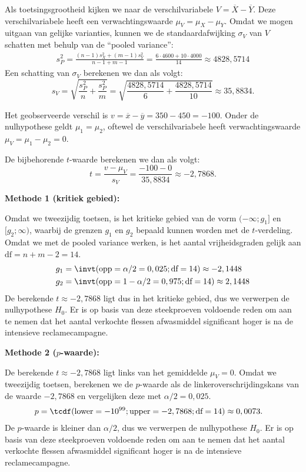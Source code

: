 {    Als toetsingsgrootheid kijken we naar de verschilvariabele $V = \overline{X} - \overline{Y}$.
    Deze verschilvariabele heeft een verwachtingswaarde $\mu_V = \mu_X - \mu_Y$.
    Omdat we mogen uitgaan van gelijke varianties, kunnen we de standaardafwijking $\sigma_V$ van $V$ schatten met behulp van de ``pooled variance'':
    \begin{align*}
        s_P^2 = \frac{(n-1)s_X^2+(m-1)s_Y^2}{n-1+m-1} = \frac{6\cdot 4600 + 10 \cdot 4000}{14} \approx 4828,5714
    \end{align*}
    Een schatting van $\sigma_V$ berekenen we dan als volgt:
    \[
        s_V = \sqrt{\frac{s_P^2}{n} + \frac{s_P^2}{m}} = \sqrt{\frac{4828,5714}{6} + \frac{4828,5714}{10}}\approx 35,8834.
    \]

    Het geobserveerde verschil is $v = \overline{x} - \overline{y} = 350 - 450 = -100$.
    Onder de nulhypothese geldt $\mu_1 = \mu_2$, oftewel de verschilvariabele heeft verwachtingswaarde $\mu_V = \mu_1 - \mu_2 = 0$.

    De bijbehorende $t$-waarde berekenen we dan als volgt:
    \[
        t = \frac{v - \mu_V}{s_V} = \frac{-100 - 0}{35,8834} \approx -2,7868.
    \]

    {\bfseries Methode 1 (kritiek gebied):}
    
    Omdat we tweezijdig toetsen, is het kritieke gebied van de vorm $(-\infty; g_1]$ en $[g_2; \infty)$, waarbij de grenzen $g_1$ en $g_2$ bepaald kunnen worden met de $t$-verdeling.
    Omdat we met de pooled variance werken, is het aantal vrijheidsgraden gelijk aan $\text{df}=n+m-2=14$.
    \begin{align*}
        g_1 &= \invt(\text{opp}=\alpha/2 = 0,025; \text{df}=14) \approx-2,1448 \\
        g_2 &= \invt(\text{opp}=1-\alpha/2 = 0,975; \text{df}=14) \approx 2,1448
    \end{align*}
    De berekende $t \approx -2,7868$ ligt dus in het kritieke gebied, dus we verwerpen de nulhypothese $H_0$.
    Er is op basis van deze steekproeven voldoende reden om aan te nemen dat het aantal verkochte flessen afwasmiddel significant hoger is na de intensieve reclamecampagne.

    {\bfseries Methode 2 ($p$-waarde):}

    De berekende $t \approx -2,7868$ ligt links van het gemiddelde $\mu_V = 0$.
    Omdat we tweezijdig toetsen, berekenen we de $p$-waarde als de linkeroverschrijdingskans van de waarde $-2,7868$ en vergelijken deze met $\alpha/2 = 0,025$.
    \begin{align*}
        p &= \tcdf(\text{lower}=-10^{99}; \text{upper}=-2,7868; \text{df}=14) \approx 0,0073.
    \end{align*}
    De $p$-waarde is kleiner dan $\alpha/2$, dus we verwerpen de nulhypothese $H_0$.
    Er is op basis van deze steekproeven voldoende reden om aan te nemen dat het aantal verkochte flessen afwasmiddel significant hoger is na de intensieve reclamecampagne.
}